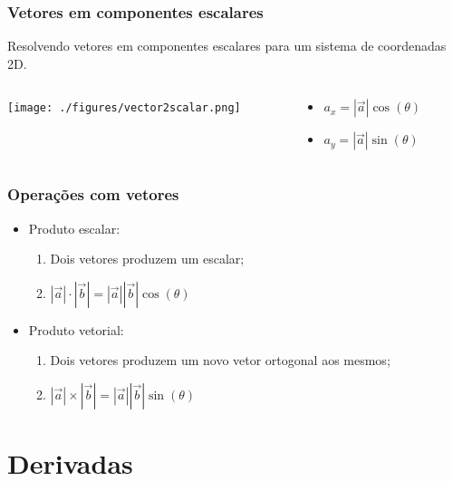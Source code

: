 \begin{frame}
\frametitle{Vetores em componentes escalares}
  \begin{block}{}
    Resolvendo vetores em componentes escalares para um sistema de coordenadas
    2D.
  \end{block}

  \begin{columns}
    \begin{column}{0.5\textwidth}
      \begin{center}
        \texttt{[image: ./figures/vector2scalar.png]}
      \end{center}
    \end{column}

    \begin{column}{0.5\textwidth}
      \begin{itemize}
        \item $a_x = |\vec{a}|\cos(\theta)$
        \item $a_y = |\vec{a}|\sin(\theta)$
      \end{itemize}
    \end{column}
  \end{columns}

\end{frame}


\begin{frame}
\frametitle{Operações com vetores}
  \begin{itemize}[<+-| alert@+>]
    \item Produto escalar:
      \begin{enumerate}[<+-| alert@+>]
        \item Dois vetores produzem um escalar;
        \item $|\vec{a}| \cdot |\vec{b}| = |\vec{a}||\vec{b}|\cos(\theta)$
      \end{enumerate}
    \item Produto vetorial:
      \begin{enumerate}[<+-| alert@+>]
        \item Dois vetores produzem um novo vetor ortogonal aos mesmos;
        \item $|\vec{a}| \times |\vec{b}| = |\vec{a}||\vec{b}|\sin(\theta)$
      \end{enumerate}
  \end{itemize}
\end{frame}

\section{Derivadas}

